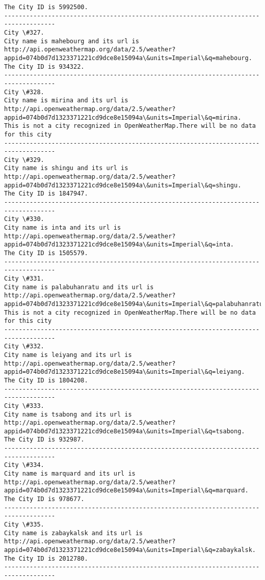 \documentclass[11pt]{article}
\begin{document}
\begin{Verbatim}[commandchars=\\\{\}]
The City ID is 5992500.
------------------------------------------------------------------------------------
City \#327.
City name is mahebourg and its url is http://api.openweathermap.org/data/2.5/weather?appid=074b0d7d1323371221cd9dce8e15094a\&units=Imperial\&q=mahebourg.
The City ID is 934322.
------------------------------------------------------------------------------------
City \#328.
City name is mirina and its url is http://api.openweathermap.org/data/2.5/weather?appid=074b0d7d1323371221cd9dce8e15094a\&units=Imperial\&q=mirina.
This is not a city recognized in OpenWeatherMap.There will be no data for this city
------------------------------------------------------------------------------------
City \#329.
City name is shingu and its url is http://api.openweathermap.org/data/2.5/weather?appid=074b0d7d1323371221cd9dce8e15094a\&units=Imperial\&q=shingu.
The City ID is 1847947.
------------------------------------------------------------------------------------
City \#330.
City name is inta and its url is http://api.openweathermap.org/data/2.5/weather?appid=074b0d7d1323371221cd9dce8e15094a\&units=Imperial\&q=inta.
The City ID is 1505579.
------------------------------------------------------------------------------------
City \#331.
City name is palabuhanratu and its url is http://api.openweathermap.org/data/2.5/weather?appid=074b0d7d1323371221cd9dce8e15094a\&units=Imperial\&q=palabuhanratu.
This is not a city recognized in OpenWeatherMap.There will be no data for this city
------------------------------------------------------------------------------------
City \#332.
City name is leiyang and its url is http://api.openweathermap.org/data/2.5/weather?appid=074b0d7d1323371221cd9dce8e15094a\&units=Imperial\&q=leiyang.
The City ID is 1804208.
------------------------------------------------------------------------------------
City \#333.
City name is tsabong and its url is http://api.openweathermap.org/data/2.5/weather?appid=074b0d7d1323371221cd9dce8e15094a\&units=Imperial\&q=tsabong.
The City ID is 932987.
------------------------------------------------------------------------------------
City \#334.
City name is marquard and its url is http://api.openweathermap.org/data/2.5/weather?appid=074b0d7d1323371221cd9dce8e15094a\&units=Imperial\&q=marquard.
The City ID is 978677.
------------------------------------------------------------------------------------
City \#335.
City name is zabaykalsk and its url is http://api.openweathermap.org/data/2.5/weather?appid=074b0d7d1323371221cd9dce8e15094a\&units=Imperial\&q=zabaykalsk.
The City ID is 2012780.
------------------------------------------------------------------------------------

\end{Verbatim}
\end{document}
